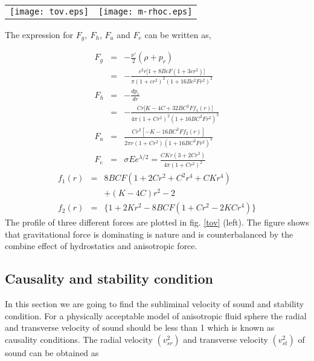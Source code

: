 \documentclass[preprintnumbers,amsmath,amssymb,floatfix,9pt,prd,twocolumn,
superscriptaddress,nofootinbib]{revtex4}
\begin{document}
\begin{figure*}[thbp]
\begin{center}
\begin{tabular}{rl}
\texttt{[image: tov.eps]}&
\texttt{[image: m-rhoc.eps]}\\
\end{tabular}
\end{center}
\caption{Counter-balancing of four forces acting on the system are plotted with radial coordinates $r$ and variation of mass with central density are shown by taking the same values of the constant mentioned in fig. \ref{md}}\label{tov}
\end{figure*}

The expression for $F_g,~F_h$, $F_a$  and $F_e$ can be written as,

\begin{eqnarray}
F_g &=& -\frac{\nu'}{2}(\rho+p_r)\nonumber\\
&=&-\frac{ c^2 r \Big[1 + 8 B c F (1 + 3 c r^2)\Big]}{\pi(1 + c r^2)^2 (1 + 16 B c^2 F r^2)^2}\\
F_h &=& -\frac{dp_r}{dr}\nonumber\\
&=&-\frac{ C r\Big[K-4C+32BC^{2}F f_1(r)\Big]}{4\pi(1 + C r^2)^2 (1 + 16 B C^2 F r^2)^2}\\
F_a &=& \frac{C r^2 [-K - 16 B C^2 F f_2(r)]}{2\pi r(1 + C r^2) (1 + 16 B C^2 F r^2)^2}\\
F_e &=& \sigma Ee^{\lambda/2}=\frac{CKr(3+2Cr^{2})}{4\pi(1+Cr^{2})^{2}}
\end{eqnarray}
\begin{eqnarray*}
f_1(r)&=&8BCF(1+2Cr^{2}+C^{2}r^{4}+CKr^{4})\\
&&+(K-4C)r^{2}-2\\
f_2(r)&=&\{1 + 2 K r^2 - 8 B C F (1 + C r^2- 2 K C r^4)\}
\end{eqnarray*}
The profile of three different forces are plotted in fig. \ref{tov} (left). The figure shows that gravitational force is dominating is nature and is counterbalanced by the combine effect of hydrostatics and anisotropic force.

\subsection{Causality and stability condition}
In this section we are going to find the subliminal velocity of sound and stability condition. For a physically acceptable model of anisotropic fluid sphere the radial and transverse velocity of sound should be less than 1 which is known as causality conditions. The radial velocity $(v_{sr}^{2})$ and transverse velocity $(v_{st}^{2})$ of sound can be obtained as
\end{document}
